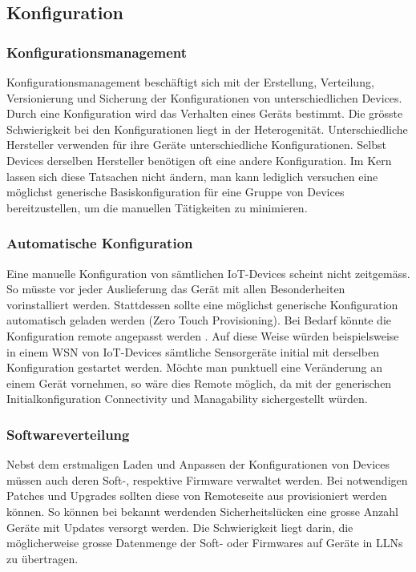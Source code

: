 \subsection{Konfiguration}
\subsubsection{Konfigurationsmanagement} Konfigurationsmanagement beschäftigt sich mit der Erstellung, Verteilung, Versionierung und Sicherung der Konfigurationen von unterschiedlichen Devices. Durch eine Konfiguration wird das Verhalten eines Geräts bestimmt. Die grösste Schwierigkeit bei den Konfigurationen liegt in der Heterogenität. Unterschiedliche Hersteller verwenden für ihre Geräte unterschiedliche Konfigurationen. Selbst Devices derselben Hersteller benötigen oft eine andere Konfiguration. Im Kern lassen sich diese Tatsachen nicht ändern, man kann lediglich versuchen eine möglichst generische Basiskonfiguration für eine Gruppe von Devices bereitzustellen, um die manuellen Tätigkeiten zu minimieren. 

\subsubsection{Automatische Konfiguration} Eine manuelle Konfiguration von sämtlichen IoT-Devices scheint nicht zeitgemäss. So müsste vor jeder Auslieferung das Gerät mit allen Besonderheiten vorinstalliert werden. Stattdessen sollte eine möglichst generische Konfiguration automatisch geladen werden (Zero Touch Provisioning). Bei Bedarf könnte die Konfiguration remote angepasst werden \cite{Weber16}. Auf diese Weise würden beispielsweise in einem WSN von IoT-Devices sämtliche Sensorgeräte initial mit derselben Konfiguration gestartet werden. Möchte man punktuell eine Veränderung an einem Gerät vornehmen, so wäre dies Remote möglich, da mit der generischen Initialkonfiguration Connectivity und Managability sichergestellt würden.

\subsubsection{Softwareverteilung} Nebst dem erstmaligen Laden und Anpassen der Konfigurationen von Devices müssen auch deren Soft-, respektive Firmware verwaltet werden. Bei notwendigen Patches und Upgrades sollten diese von Remoteseite aus provisioniert werden können. So können bei bekannt werdenden Sicherheitslücken eine grosse Anzahl Geräte mit Updates versorgt werden. Die Schwierigkeit liegt darin, die möglicherweise grosse Datenmenge der Soft- oder Firmwares auf Geräte in LLNs zu übertragen.

